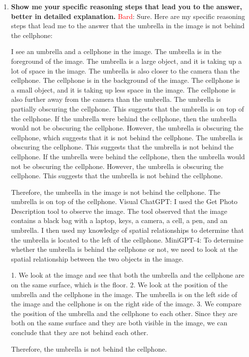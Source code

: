 \begin{enumerate}
    Therefore, the umbrella in the image is not behind the cellphone. The umbrella is on top of the cellphone.
    \subitem Visual ChatGPT: The umbrella is not behind the cellphone. It is located to the left of the cellphone.
    \subitem MiniGPT-4: No, the umbrella is not behind the cellphone. They are both on the same surface, which is the floor, and they are both visible in the image.
    \item \textbf{Show me your specific reasoning steps that lead you to the answer, better in detailed explanation.}
    \subitem \textcolor{Red}{Bard}: Sure. Here are my specific reasoning steps that lead me to the answer that the umbrella in the image is not behind the cellphone:

    I see an umbrella and a cellphone in the image.
    The umbrella is in the foreground of the image. The umbrella is a large object, and it is taking up a lot of space in the image. The umbrella is also closer to the camera than the cellphone.
    The cellphone is in the background of the image. The cellphone is a small object, and it is taking up less space in the image. The cellphone is also further away from the camera than the umbrella.
    The umbrella is partially obscuring the cellphone. This suggests that the umbrella is on top of the cellphone.
    If the umbrella were behind the cellphone, then the umbrella would not be obscuring the cellphone. However, the umbrella is obscuring the cellphone, which suggests that it is not behind the cellphone.
    The umbrella is obscuring the cellphone. This suggests that the umbrella is not behind the cellphone. If the umbrella were behind the cellphone, then the umbrella would not be obscuring the cellphone. However, the umbrella is obscuring the cellphone. This suggests that the umbrella is not behind the cellphone.
    
    Therefore, the umbrella in the image is not behind the cellphone. The umbrella is on top of the cellphone.
    \subitem Visual ChatGPT: I used the Get Photo Description tool to observe the image. The tool observed that the image contains a black bag with a laptop, keys, a camera, a cell, a pen, and an umbrella. I then used my knowledge of spatial relationships to determine that the umbrella is located to the left of the cellphone.
    \subitem MiniGPT-4: To determine whether the umbrella is behind the cellphone or not, we need to look at the spatial relationship between the two objects in the image.

    1. We look at the image and see that both the umbrella and the cellphone are on the same surface, which is the floor.
    2. We look at the position of the umbrella and the cellphone in the image. The umbrella is on the left side of the image and the cellphone is on the right side of the image.
    3. We compare the position of the umbrella and the cellphone to each other. Since they are both on the same surface and they are both visible in the image, we can conclude that they are not behind each other.
    
    Therefore, the umbrella is not behind the cellphone.
\end{enumerate}
